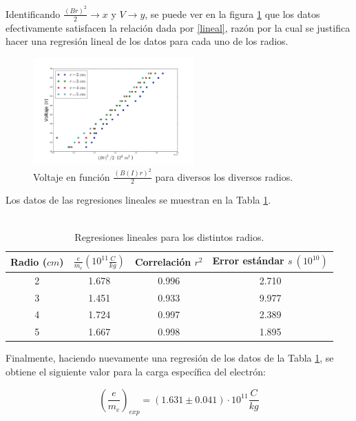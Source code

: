 \documentclass[prb,aps,twocolumn,preprintnumbers,amsmath,amssymb]{revtex4}
\begin{document}
Identificando $\frac{(Br)^2}{2} \rightarrow x$ y $V \rightarrow y$, se puede ver en la figura \ref{fig:lineal} que los datos efectivamente satisfacen la relación dada por \eqref{lineal}, razón por la cual se justifica hacer una regresión lineal de los datos para cada uno de los radios.\\

\begin{figure}[h!]
	\centering
	\includegraphics[width=0.55\textwidth]{carga-masa-reg}
	\caption{Voltaje en función $\frac{(B(I)r)^2}{2}$ para diversos los diversos radios.}
	\label{fig:lineal}
\end{figure}

Los datos de las regresiones lineales se muestran en la Tabla \ref{Tabla 2}. \\\\ 

\begin{table}[h!]
	\caption{\label{Tabla 2}Regresiones lineales para los distintos radios.}
	\begin{ruledtabular}
		\begin{tabular}{cccc}
			Radio ($cm$) & $\frac{e}{m_{e}} (10^{11} \frac{C}{kg})$ & Correlación $r^2$ & Error estándar $s\ (10^{10})$ \\
			\hline
			2 & 1.678 & 0.996 & 2.710 \\
			3 & 1.451 & 0.933 & 9.977 \\
			4 & 1.724 & 0.997 & 2.389 \\
			5 & 1.667 & 0.998 & 1.895 \\
		\end{tabular}
	\end{ruledtabular}
\end{table}

Finalmente, haciendo nuevamente una regresión de los datos de la Tabla \ref{Tabla 2}, se obtiene el siguiente valor para la carga específica del electrón:

\begin{equation}
\left( \frac{e}{m_{e}} \right)_{exp} = (1.631 \pm 0.041) \cdot 10^{11} \frac{C}{kg} 
\end{equation}
\end{document}
